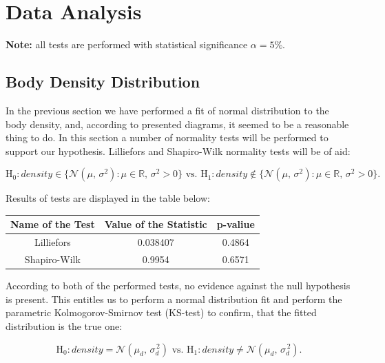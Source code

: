 \documentclass[11pt,american,american]{article}
\begin{document}
\newpage


\section{Data Analysis}\label{sec:analysis}

\textbf{Note:} all tests are performed with statistical significance $\alpha = 5\%$.

\subsection{Body Density Distribution}\label{sec:density_distr}

In the previous section we have performed a fit of normal distribution to the body density, and, according to presented diagrams, it seemed to be a reasonable thing to do. In this section a number of normality tests will be performed to support our hypothesis. Lilliefors and Shapiro-Wilk normality tests will be of aid: 

\begin{equation*}
	\text{H}_{0}: density \in \{ \mathcal{N} (\mu,\,\sigma^{2}): \mu \in \mathbb{R}, \, \sigma^{2} > 0 \} \text{ vs. }
	\text{H}_{1}: density \not\in \{ \mathcal{N} (\mu,\,\sigma^{2}): \mu \in \mathbb{R}, \, \sigma^{2} > 0 \}.
\end{equation*}

\medskip

Results of tests are displayed in the table below:

\begin{table}[ht!]
	\centering
	\begin{tabular}{|c||c|c|}
		\hline 
		Name of the Test & Value of the Statistic & p-valiue \\ 
		\hline \hline
		Lilliefors & 0.038407 & 0.4864 \\ 
		\hline 
		Shapiro-Wilk & 0.9954 & 0.6571 \\ 
		\hline 
	\end{tabular} 
\end{table}

According to both of the performed tests, no evidence against the null hypothesis is present. This entitles us to perform a normal distribution fit and perform the parametric Kolmogorov-Smirnov test (KS-test) to confirm, that the fitted distribution is the true one:

\begin{equation*}
	\text{H}_{0}: density = \mathcal{N} (\mu_{d},\,\sigma^{\,2}_{d}) \text{ vs. }
	\text{H}_{1}: density \neq \mathcal{N} (\mu_{d},\,\sigma^{\,2}_{d}).
\end{equation*}
\end{document}
